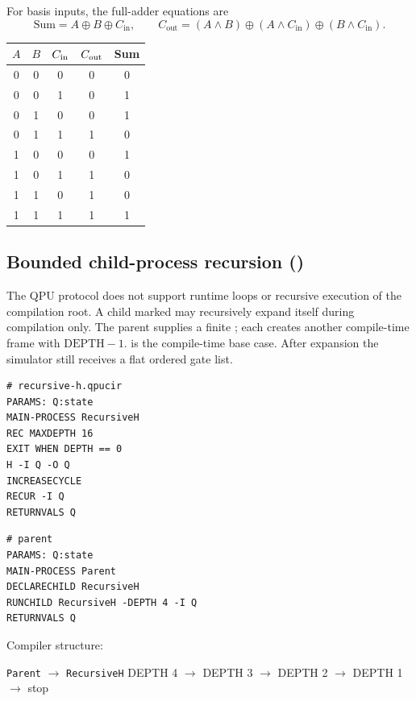 For basis inputs, the full-adder equations are
\[
\mathrm{Sum}=A\oplus B\oplus C_{\mathrm{in}},\qquad
C_{\mathrm{out}}=(A\land B)\oplus(A\land C_{\mathrm{in}})
\oplus(B\land C_{\mathrm{in}}).
\]
\begin{center}
\begin{tabular}{ccc|cc}\toprule
$A$&$B$&$C_{\rm in}$&$C_{\rm out}$&Sum\\\midrule
0&0&0&0&0\\0&0&1&0&1\\0&1&0&0&1\\0&1&1&1&0\\
1&0&0&0&1\\1&0&1&1&0\\1&1&0&1&0\\1&1&1&1&1\\\bottomrule
\end{tabular}
\end{center}

\subsection{Bounded child-process recursion (\implemented)}
\hypertarget{bounded-child-recursion}{}

The QPU protocol does not support runtime loops or recursive execution of the
compilation root. A child marked  may recursively expand itself during
compilation only. The parent supplies a finite ; each
 creates another compile-time frame with $\mathrm{DEPTH}-1$.
 is the compile-time base case. After expansion the
simulator still receives a flat ordered gate list.

\begin{lstlisting}
# recursive-h.qpucir
PARAMS: Q:state
MAIN-PROCESS RecursiveH
REC MAXDEPTH 16
EXIT WHEN DEPTH == 0
H -I Q -O Q
INCREASECYCLE
RECUR -I Q
RETURNVALS Q
\end{lstlisting}

\begin{lstlisting}
# parent
PARAMS: Q:state
MAIN-PROCESS Parent
DECLARECHILD RecursiveH
RUNCHILD RecursiveH -DEPTH 4 -I Q
RETURNVALS Q
\end{lstlisting}

Compiler structure:

\begin{center}
\texttt{Parent}
$\rightarrow$
\texttt{RecursiveH} DEPTH 4
$\rightarrow$
DEPTH 3
$\rightarrow$
DEPTH 2
$\rightarrow$
DEPTH 1
$\rightarrow$ stop
\end{center}

